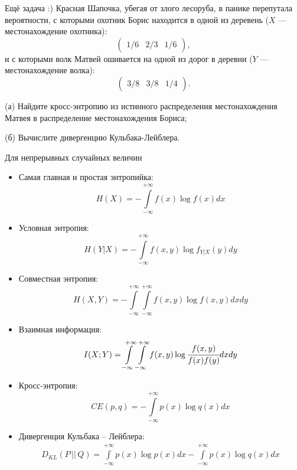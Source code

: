 \documentclass[final]{beamer}
\newlength{\onecolwid}
\newlength{\twocolwid}
\begin{document}
\begin{frame}[t]
\begin{columns}[t]
\begin{column}{\twocolwid}
\begin{columns}[t,totalwidth=\twocolwid]
\begin{column}{\onecolwid}
\begin{alertblock}{Ещё задача :)}
	Красная Шапочка, убегая от злого лесоруба, в панике перепутала вероятности, с которыми охотник Борис находится в одной из деревень ($X$ --- местонахождение охотника):
\[\begin{pmatrix}
    1/6 & 2/3 & 1/6
\end{pmatrix} , \] и с которыми волк Матвей ошивается на одной из дорог в деревни ($Y$ --- местонахождение волка):
\[\begin{pmatrix}
    3/8 & 3/8 & 1/4 
\end{pmatrix} .\]

(а) Найдите кросс-энтропию из истинного распределения местонахождения Матвея в распределение местонахождения Бориса;

(б) Вычислите дивергенцию Кульбака-Лейблера.
\end{alertblock}

\begin{block}{Для непрерывных случайных величин}

\begin{itemize}
	\item Самая главная и простая энтропийка:
	\[H(X)=-\int\limits_{-\infty}^{+\infty} f(x)\log f(x)dx \]
	\item Условная энтропия:
	\[H(Y|X)=-\int\limits_{-\infty}^{+\infty} f(x, y)\log f_{Y|X}(y)dy \]
	\item Совместная энтропия:
	\[H(X, Y)=-\int\limits_{-\infty}^{+\infty} \int\limits_{-\infty}^{+\infty} f(x, y)\log f(x, y)dxdy \]
	\item Взаимная информация:
	\[I(X; Y)=\int\limits_{-\infty}^{+\infty} \int\limits_{-\infty}^{+\infty} f(x, y) \log \cfrac{f(x, y)}{f(x)f(y)}dxdy \]
	\item Кросс-энтропия:
	\[CE(p, q)=-\int\limits_{-\infty}^{+\infty}p(x)\log q(x) dx \]
	\item Дивергенция Кульбака -- Лейблера:
	\begin{multline*}
		D_{KL}(P\, ||\, Q)=\int\limits_{-\infty}^{+\infty} p(x)\log p(x)dx -\int\limits_{-\infty}^{+\infty} p(x)\log q(x)dx
	\end{multline*}
\end{itemize}
\end{block}



\end{column}
\end{columns}
\end{column}
\end{columns}
\end{frame}
\end{document}
